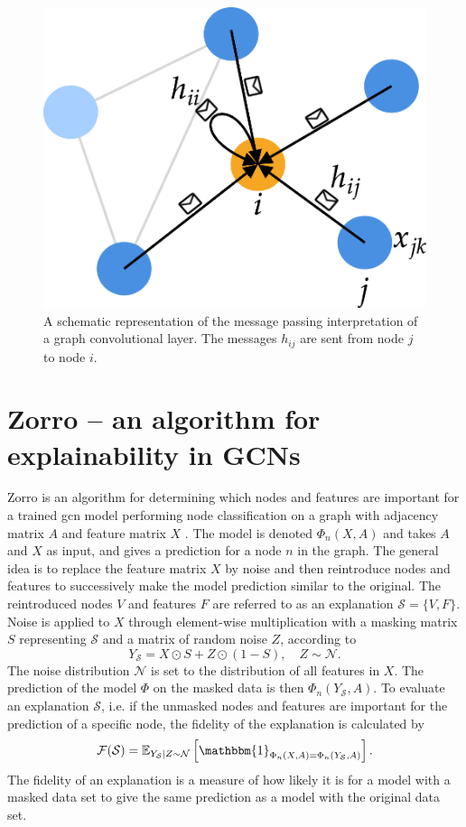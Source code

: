 \begin{figure}[!htbp]
    \centering
    \includegraphics[width=0.5\linewidth]{chapters/images_theory/message_passing_v2.png}
    \caption{A schematic representation of the message passing interpretation of a graph convolutional layer. The messages $h_{ij}$ are sent from node $j$ to node $i$.}
    \label{fig:message_passing}
\end{figure}

\section{Zorro -- an algorithm for explainability in GCNs}
\label{sec:zorro}

Zorro is an algorithm for determining which nodes and features are important for a trained \acrshort{gcn} model performing node classification on a graph with adjacency matrix $A$ and feature matrix $X$ \cite{zorro}. The model is denoted $\Phi_n(X,A)$ and takes $A$ and $X$ as input, and gives a prediction for a node $n$ in the graph. The general idea is to replace the feature matrix $X$ by noise and then reintroduce nodes and features to successively make the model prediction similar to the original. The reintroduced nodes $V$ and features $F$ are referred to as an explanation $\mathcal{S} = \{V, F\}$. Noise is applied to $X$ through element-wise multiplication with a masking matrix $S$ representing $\mathcal{S}$ and a matrix of random noise $Z$, according to
\begin{equation}
    Y_\mathcal{S} = X \odot S + Z \odot (1- S), \quad Z \sim \mathcal{N}.
\end{equation}
The noise distribution $\mathcal{N}$ is set to the distribution of all features in $X$. The prediction of the model $\Phi$ on the masked data is then $\Phi_n(Y_{\mathcal{S}}, A)$. To evaluate an explanation $\mathcal{S}$, i.e. if the unmasked nodes and features are important for the prediction of a specific node, the fidelity of the explanation is calculated by
\begin{equation}
    \mathcal{F}(\mathcal{S}) = \mathbb{E}_{Y_{\mathcal{S}}|Z\sim\mathcal{N}}\left[\mathbbm{1}_{\Phi_n(X,A) = \Phi_n(Y_{\mathcal{S}},A)}\right].
    \label{eq:Ys}
\end{equation}
The fidelity of an explanation is a measure of how likely it is for a model with a masked data set to give the same prediction as a model with the original data set.

